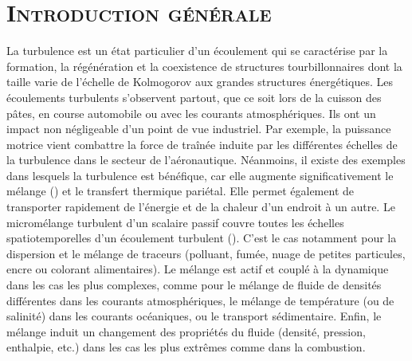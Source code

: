 {}

\chead[\fancyplain{}{}]
      {\fancyplain{}{}}
\lfoot[\fancyplain{}{}]%
      {\fancyplain{}{}}
\cfoot[\fancyplain{}{\thepage}]
      {\fancyplain{}{\thepage}}
\rfoot[\fancyplain{}{}]%
     {\fancyplain{}{\scriptsize}}
     
\thispagestyle{plain}


\chapter*{\lettrine[lines=1]{I}{ntroduction générale}}
\label{ch/introduction}

\vspace{1.5cm}

La turbulence est un état particulier d'un écoulement qui se caractérise par la formation, la régénération et la coexistence de structures tourbillonnaires dont la taille varie de l'échelle de Kolmogorov aux grandes structures énergétiques. Les écoulements turbulents s'observent partout, que ce soit lors de la cuisson des pâtes, en course automobile ou avec les courants atmosphériques. Ils ont un impact non négligeable d'un point de vue industriel. Par exemple, la puissance motrice vient combattre la force de traînée induite par les différentes échelles de la turbulence dans le secteur de l'aéronautique. Néanmoins, il existe des exemples dans lesquels la turbulence est bénéfique, car elle augmente significativement le mélange (\cite{Dimotakis2005}) et le transfert thermique pariétal. Elle permet également de transporter rapidement de l’énergie et de la chaleur d’un endroit à un autre. Le micromélange turbulent d'un scalaire passif couvre toutes les échelles spatiotemporelles d’un écoulement turbulent (\cite{Eckart1948, Yakhot2008}). C’est le cas notamment pour la dispersion et le mélange de traceurs (polluant, fumée, nuage de petites particules, encre ou colorant alimentaires). Le mélange est actif et couplé à la dynamique dans les cas les plus complexes, comme pour le mélange de fluide de densités différentes dans les courants atmosphériques, le mélange de température (ou de salinité) dans les courants océaniques, ou le transport sédimentaire. Enfin, le mélange induit un changement des propriétés du fluide (densité, pression, enthalpie, etc.) dans les cas les plus extrêmes comme dans la combustion.\\

